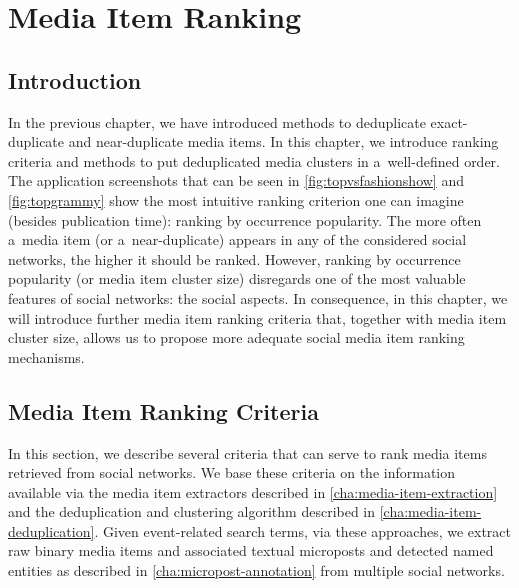 \chapter{Media Item Ranking}
\label{cha:media-item-ranking}

\ifpdf
    \graphicspath{{9_media_item_ranking/figures/PNG/}{9_media_item_ranking/figures/PDF/}{9_media_item_ranking/figures/}}
\else
    \graphicspath{{9_media_item_ranking/figures/EPS/}{9_media_item_ranking/figures/}}
\fi

\section{Introduction}

In the previous chapter, we have introduced methods
to deduplicate exact-duplicate and near-duplicate media items.
In this chapter, we introduce ranking criteria and methods
to put deduplicated media clusters in a~well-defined order.
The application screenshots that can be seen in \autoref{fig:topvsfashionshow}
and \autoref{fig:topgrammy} show the
most intuitive ranking criterion one can imagine (besides publication time):
ranking by occurrence popularity.
The more often a~media item (or a~near-duplicate)
appears in any of the considered social networks,
the higher it should be ranked.
However, ranking by occurrence popularity (or media item cluster size)
disregards one of the most valuable features of social networks:
the social aspects.
In consequence, in this chapter, we will introduce
further media item ranking criteria that,
together with media item cluster size,
allows us to propose more adequate social media item ranking mechanisms.

\section{Media Item Ranking Criteria}

In this section, we describe several criteria that can serve to rank
media items retrieved from social networks.
We base these criteria on the information available via
the media item extractors
described in \autoref{cha:media-item-extraction} and
the deduplication and clustering algorithm
described in \autoref{cha:media-item-deduplication}.
Given event-related search terms,
via these approaches, we extract raw binary media items and associated textual microposts and detected named entities as described in
\autoref{cha:micropost-annotation}
from multiple social networks.

